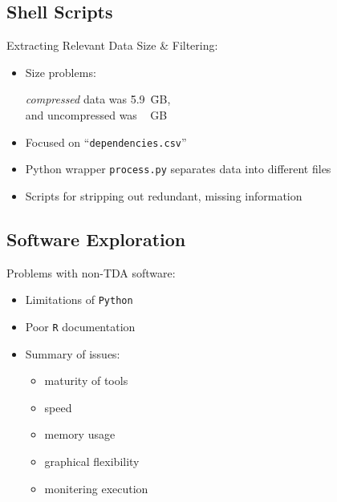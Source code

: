 \documentclass{beamer}
\theoremstyle{definition}
\theoremstyle{example}
\theoremstyle{conjecture}
\def\code#1{\texttt{#1}} %
\begin{document}
\subsection{Shell Scripts}
\label{subsc.scripts}
\begin{frame}{Extracting Relevant Data}
Size \& Filtering:
\begin{itemize}
  \item Size problems:\\
  \begin{tabbing} %
  \emph{compressed} data was \quad \=5.9\ \= GB,\\
  and uncompressed was \ \> GB %
  \end{tabbing}
  \item Focused on ``\code{dependencies.csv}''
  \item Python wrapper \code{process.py} separates data into different files %
  \item Scripts for stripping out redundant, 
  		missing information %
\end{itemize}
\end{frame}

\subsection{Software Exploration}
\label{subsc.software}
\begin{frame}
Problems with non-TDA software:
\begin{itemize}
  \item Limitations of \code{Python}%
  \item Poor \code{R} documentation%
  \item Summary of issues:\\
 	\begin{itemize}
	   \item maturity of tools
       \item speed
       \item memory usage
       \item graphical flexibility
   	   \item monitering execution
 	\end{itemize}
\end{itemize}
\end{frame}
\end{document}
